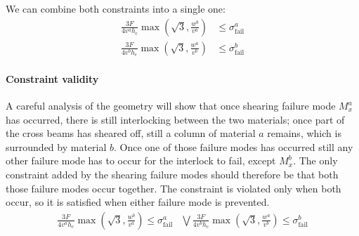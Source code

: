We can combine both constraints into a single one:
\begin{align*}
	\frac{ 3 F }{ 4 v^a h_\text{c} }  \max{\left( \sqrt{3}, \frac{w^b}{v^a} \right)} &\le \sigma^a_\text{fail}  \\
	\frac{ 3 F }{ 4 v^b h_\text{c} }  \max{\left( \sqrt{3}, \frac{w^a}{v^b} \right)} &\le \sigma^b_\text{fail}  
\end{align*}


\paragraph{Constraint validity}
A careful analysis of the geometry will show that once shearing failure mode $M_x^a$ has occurred, 
there is still interlocking between the two materials;
once part of the cross beams has sheared off, still a column of material $a$ remains, which is surrounded by material $b$.
Once one of those failure modes has occurred still any other failure mode has to occur for the interlock to fail, except $M_x^b$.
The only constraint added by the shearing failure modes should therefore be that both those failure modes occur together.
The constraint is violated only when both occur, so it is satisfied when either failure mode is prevented.
\begin{align*}
	\frac{ 3 F }{ 4 v^a h_\text{c} }  \max{\left( \sqrt{3}, \frac{w^b}{v^a} \right)} \le \sigma^a_\text{fail}  &\bigvee
	\frac{ 3 F }{ 4 v^b h_\text{c} }  \max{\left( \sqrt{3}, \frac{w^a}{v^b} \right)} \le \sigma^b_\text{fail}  
\end{align*}

